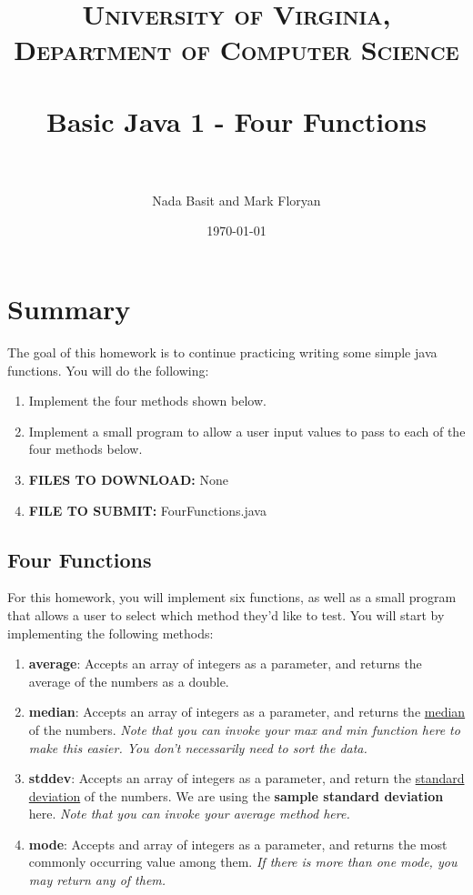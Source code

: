 \documentclass[paper=a4, fontsize=11pt, parskip=full]{scrartcl} %
\title{	
\normalfont \normalsize 
\textsc{University of Virginia, Department of Computer Science} \\ [25pt] %
\horrule{0.5pt} \\[0.4cm] %
\huge Basic Java 1 - Four Functions \\ %
\horrule{2pt} \\[0.5cm] %
}
\author{Nada Basit and Mark Floryan}
\date{\normalsize\today} %
\numberwithin{equation}{section} %
\numberwithin{figure}{section} %
\numberwithin{table}{section} %
\begin{document}
\maketitle %

\section{Summary}

The goal of this homework is to continue practicing writing some simple java functions. You will do the following:

\begin{enumerate}
	\item Implement the four methods shown below.
	\item Implement a small program to allow a user input values to pass to each of the four methods below.
	\item \textbf{FILES TO DOWNLOAD:} None
	\item \textbf{FILE TO SUBMIT:} FourFunctions.java
\end{enumerate}

\subsection{Four Functions}

For this homework, you will implement six functions, as well as a small program that allows a user to select which method they'd like to test. You will start by implementing the following methods:

\begin{enumerate}
\item \textbf{average}: Accepts an array of integers as a parameter, and returns the average of the numbers as a double.
\item \textbf{median}: Accepts an array of integers as a parameter, and returns the \href{https://en.wikipedia.org/wiki/Median}{median} of the numbers. \emph{Note that you can invoke your max and min function here to make this easier. You don't necessarily need to sort the data.} 
\item \textbf{stddev}: Accepts an array of integers as a parameter, and return the \href{https://en.wikipedia.org/wiki/Standard_deviation}{standard deviation} of the numbers. We are using the \textbf{sample standard deviation} here. \emph{Note that you can invoke your average method here.}
\item \textbf{mode}: Accepts and array of integers as a parameter, and returns the most commonly occurring value among them. \emph{If there is more than one mode, you may return any of them.}
\end{enumerate}
\end{document}
